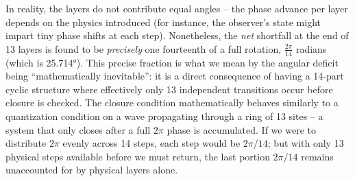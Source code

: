 \documentclass[]{article}
\begin{document}
In reality, the layers do not contribute equal angles -- the phase
advance per layer depends on the physics introduced (for instance, the
observer's state might impart tiny phase shifts at each step​).
Nonetheless, the \emph{net} shortfall at the end of 13 layers is found
to be \emph{precisely} one fourteenth of a full rotation,
$\frac{2\pi}{14}$ radians (which is
25.714°). This precise fraction is what we mean by the angular deficit
being ``mathematically inevitable'': it is a direct consequence of
having a 14-part cyclic structure where effectively only 13 independent
transitions occur before closure is checked. The closure condition
mathematically behaves similarly to a quantization condition on a wave
propagating through a ring of 13 sites -- a system that only closes
after a full $2\pi$ phase is accumulated​. If we were
to distribute $2\pi$ evenly across 14 steps, each step
would be $2\pi/14$; but with only 13 physical steps
available before we must return, the last portion
$2\pi/14$ remains unaccounted for by physical layers
alone.
\end{document}
